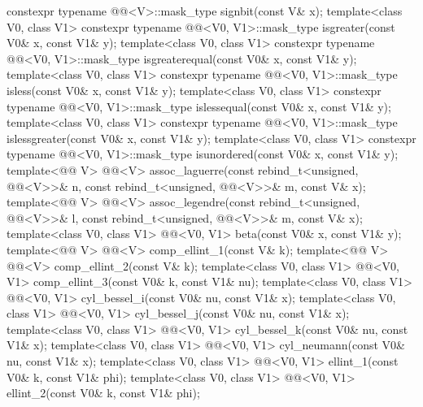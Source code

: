 \begin{codeblock}
{    constexpr typename @@<V>::mask_type signbit(const V& x);
  template<class V0, class V1>
    constexpr typename @@<V0, V1>::mask_type
      isgreater(const V0& x, const V1& y);
  template<class V0, class V1>
    constexpr typename @@<V0, V1>::mask_type
      isgreaterequal(const V0& x, const V1& y);
  template<class V0, class V1>
    constexpr typename @@<V0, V1>::mask_type
      isless(const V0& x, const V1& y);
  template<class V0, class V1>
    constexpr typename @@<V0, V1>::mask_type
      islessequal(const V0& x, const V1& y);
  template<class V0, class V1>
    constexpr typename @@<V0, V1>::mask_type
      islessgreater(const V0& x, const V1& y);
  template<class V0, class V1>
    constexpr typename @@<V0, V1>::mask_type
      isunordered(const V0& x, const V1& y);
  template<@@ V>
    @@<V> assoc_laguerre(const rebind_t<unsigned, @@<V>>& n, const
      rebind_t<unsigned, @@<V>>& m,
                     const V& x);
  template<@@ V>
    @@<V> assoc_legendre(const rebind_t<unsigned, @@<V>>& l, const
      rebind_t<unsigned, @@<V>>& m,
                     const V& x);
  template<class V0, class V1>
    @@<V0, V1> beta(const V0& x, const V1& y);
  template<@@ V> @@<V> comp_ellint_1(const V& k);
  template<@@ V> @@<V> comp_ellint_2(const V& k);
  template<class V0, class V1>
    @@<V0, V1> comp_ellint_3(const V0& k, const V1& nu);
  template<class V0, class V1>
    @@<V0, V1> cyl_bessel_i(const V0& nu, const V1& x);
  template<class V0, class V1>
    @@<V0, V1> cyl_bessel_j(const V0& nu, const V1& x);
  template<class V0, class V1>
    @@<V0, V1> cyl_bessel_k(const V0& nu, const V1& x);
  template<class V0, class V1>
    @@<V0, V1> cyl_neumann(const V0& nu, const V1& x);
  template<class V0, class V1>
    @@<V0, V1> ellint_1(const V0& k, const V1& phi);
  template<class V0, class V1>
    @@<V0, V1> ellint_2(const V0& k, const V1& phi);
}
\end{codeblock}
